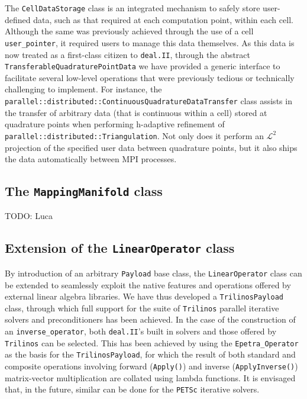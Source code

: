 \documentclass{ansarticle-preprint}
\newcommand{\specialword}[1]{\texttt{#1}}
\newcommand{\dealii}{{\specialword{deal.II}}}
\newcommand{\trilinos}{{\specialword{Trilinos}}}
\newcommand{\petsc}{\specialword{PETSc}}
\begin{document}
The \texttt{CellDataStorage} class is an integrated mechanism to safely store user-defined data, such as that required at each computation point, within each cell.
Although the same was previously achieved through the use of a cell \texttt{user\_pointer}, it required users to manage this data themselves.
As this data is now treated as a first-class citizen to \dealii{}, through the abstract \texttt{TransferableQuadraturePointData} we have provided a generic interface to facilitate several low-level operations that were previously tedious or technically challenging to implement.
For instance, the \texttt{parallel::distributed::ContinuousQuadratureDataTransfer} class assists in the transfer of arbitrary data (that is continuous within a cell) stored at quadrature points when performing h-adaptive refinement of \texttt{parallel::distributed::Triangulation}.
Not only does it perform an $\mathcal{L}^2$ projection of the specified user data between quadrature points, but it also ships the data automatically between MPI processes.

\subsection{The \texttt{MappingManifold} class}

TODO: Luca

\subsection{Extension of the \texttt{LinearOperator} class}

By introduction of an arbitrary \texttt{Payload} base class, the \texttt{LinearOperator} class can be extended to seamlessly exploit the native features and operations offered by external linear algebra libraries.
We have thus developed a \texttt{TrilinosPayload} class, through which full support for the suite of {\trilinos} parallel iterative solvers and preconditioners has been achieved.
In the case of the construction of an \texttt{inverse\_operator}, both \dealii's built in solvers and those offered by {\trilinos} can be selected.
This has been achieved by using the \texttt{Epetra\_Operator} as the basis for the \texttt{TrilinosPayload}, for which the result of both standard and composite operations involving forward (\texttt{Apply()}) and inverse (\texttt{ApplyInverse()}) matrix-vector multiplication are collated using lambda functions.
It is envisaged that, in the future, similar can be done for the {\petsc} iterative solvers.
\end{document}

